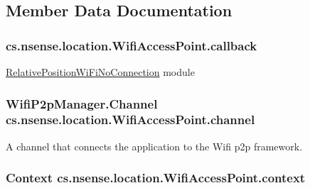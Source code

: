 \subsection{Member Data Documentation}
\hypertarget{classcs_1_1nsense_1_1location_1_1_wifi_access_point_aa4ccc9d8d98e71518c3f53c9d58de630}{
\subsubsection[{callback}]{ cs.\-nsense.\-location.\-Wifi\-Access\-Point.\-callback\hspace{0.3cm}{\ttfamily [private]}}}\label{classcs_1_1nsense_1_1location_1_1_wifi_access_point_aa4ccc9d8d98e71518c3f53c9d58de630}
\hyperlink{classcs_1_1nsense_1_1location_1_1_relative_position_wi_fi_no_connection}{Relative\-Position\-Wi\-Fi\-No\-Connection} module \hypertarget{classcs_1_1nsense_1_1location_1_1_wifi_access_point_a1078104d713e6c15634ce9fd0eb43ec5}{
\subsubsection[{channel}]{\setlength{\rightskip}{0pt plus 5cm}Wifi\-P2p\-Manager.\-Channel cs.\-nsense.\-location.\-Wifi\-Access\-Point.\-channel\hspace{0.3cm}{\ttfamily [private]}}}\label{classcs_1_1nsense_1_1location_1_1_wifi_access_point_a1078104d713e6c15634ce9fd0eb43ec5}
A channel that connects the application to the Wifi p2p framework. \hypertarget{classcs_1_1nsense_1_1location_1_1_wifi_access_point_a5fd56b2fb85ff6005d6802e158d116ff}{
\subsubsection[{context}]{\setlength{\rightskip}{0pt plus 5cm}Context cs.\-nsense.\-location.\-Wifi\-Access\-Point.\-context\hspace{0.3cm}{\ttfamily [private]}}}\label{classcs_1_1nsense_1_1location_1_1_wifi_access_point_a5fd56b2fb85ff6005d6802e158d116ff}
